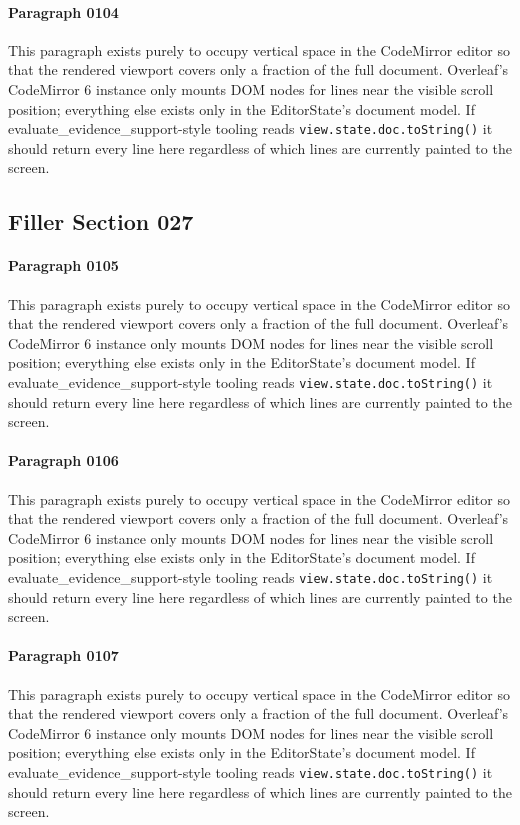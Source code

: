 \documentclass{article}
\begin{document}
\paragraph{Paragraph 0104}
This paragraph exists purely to occupy vertical space in the CodeMirror editor so that the rendered viewport covers only a fraction of the full document. Overleaf's CodeMirror 6 instance only mounts DOM nodes for lines near the visible scroll position; everything else exists only in the EditorState's document model. If evaluate\_evidence\_support-style tooling reads \texttt{view.state.doc.toString()} it should return every line here regardless of which lines are currently painted to the screen.

\subsection{Filler Section 027}
\paragraph{Paragraph 0105}
This paragraph exists purely to occupy vertical space in the CodeMirror editor so that the rendered viewport covers only a fraction of the full document. Overleaf's CodeMirror 6 instance only mounts DOM nodes for lines near the visible scroll position; everything else exists only in the EditorState's document model. If evaluate\_evidence\_support-style tooling reads \texttt{view.state.doc.toString()} it should return every line here regardless of which lines are currently painted to the screen.

\paragraph{Paragraph 0106}
This paragraph exists purely to occupy vertical space in the CodeMirror editor so that the rendered viewport covers only a fraction of the full document. Overleaf's CodeMirror 6 instance only mounts DOM nodes for lines near the visible scroll position; everything else exists only in the EditorState's document model. If evaluate\_evidence\_support-style tooling reads \texttt{view.state.doc.toString()} it should return every line here regardless of which lines are currently painted to the screen.

\paragraph{Paragraph 0107}
This paragraph exists purely to occupy vertical space in the CodeMirror editor so that the rendered viewport covers only a fraction of the full document. Overleaf's CodeMirror 6 instance only mounts DOM nodes for lines near the visible scroll position; everything else exists only in the EditorState's document model. If evaluate\_evidence\_support-style tooling reads \texttt{view.state.doc.toString()} it should return every line here regardless of which lines are currently painted to the screen.
\end{document}
